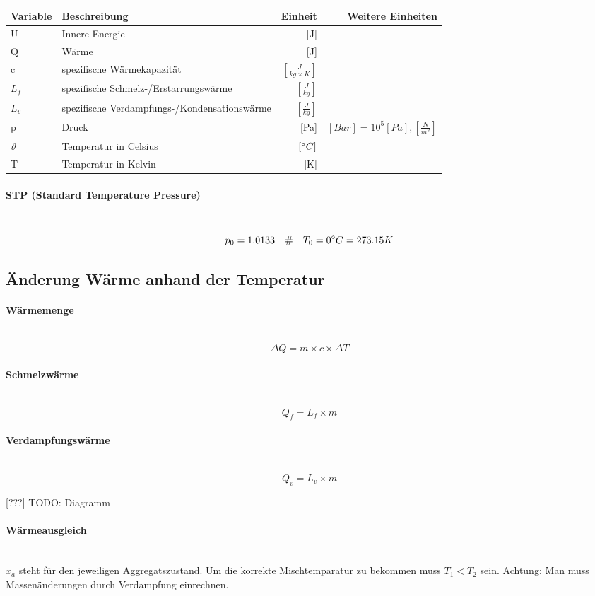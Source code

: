 \documentclass[a4paper,twoside,10pt]{article}
\newcommand{\lbparagraph}[1]{\paragraph{#1}\mbox{}\\}
\newcommand{\eqsp}[1]{\quad\#\quad}
\begin{document}
\begin{tabular}{l|l|r|r}
    Variable & Beschreibung & Einheit & Weitere Einheiten \\
    \hline
    U & Innere Energie & [J] & \\
    Q & Wärme & [J] & \\
    c & spezifische Wärmekapazität & $[\frac{J}{kg \times K}]$ & \\
    $L_f$ & spezifische Schmelz-/Erstarrungswärme & $[\frac{J}{kg}]$ & \\
    $L_v$ & spezifische Verdampfungs-/Kondensationswärme & $[\frac{J}{kg}]$ & \\
    p & Druck & [Pa] & $[Bar] =10^5 [Pa], [\frac{N}{m^2}]$ \\
    $\vartheta$ & Temperatur in Celsius & $[{\degree}C]$ & \\
    T & Temperatur in Kelvin & [K] &
\end{tabular}

\lbparagraph{STP (Standard Temperature Pressure)}

\begin{equation}
    p_0 = 1.0133
    \eqsp{}
    T_0 = 0{\degree}C = 273.15K 
\end{equation}

\subsection{Änderung Wärme anhand der Temperatur}

\lbparagraph{Wärmemenge}

\begin{equation}
    {\Delta}Q = m \times c \times {\Delta}T
\end{equation}

\lbparagraph{Schmelzwärme}

\begin{equation}
    Q_f = L_f \times m
\end{equation}

\lbparagraph{Verdampfungswärme}

\begin{equation}
    Q_v = L_v \times m
\end{equation}

[???] TODO: Diagramm

\lbparagraph{Wärmeausgleich}

$x_a$ steht für den jeweiligen Aggregatszustand. Um die korrekte Mischtemparatur zu bekommen muss $T_1 < T_2$ sein. Achtung: Man muss Massenänderungen durch Verdampfung einrechnen.
\end{document}
